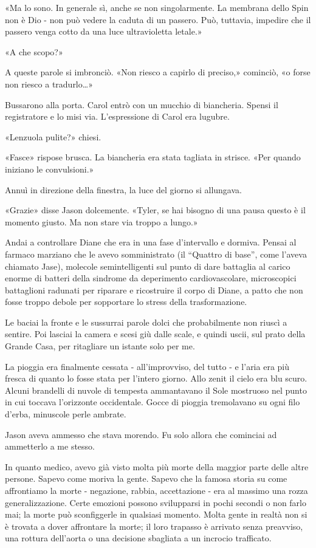 «Ma lo sono. In generale sì, anche se non singolarmente. La membrana
dello Spin non è Dio - non può vedere la caduta di un passero. Può,
tuttavia, impedire che il passero venga cotto da una luce ultravioletta
letale.»

«A che scopo?»

A queste parole si imbronciò. «Non riesco a capirlo di preciso,»
cominciò, «o forse non riesco a tradurlo\ldots»

Bussarono alla porta. Carol entrò con un mucchio di biancheria. Spensi
il registratore e lo misi via. L'espressione di Carol era lugubre.

«Lenzuola pulite?» chiesi.

«Fasce» rispose brusca. La biancheria era stata tagliata in strisce.
«Per quando iniziano le convulsioni.»

Annuì in direzione della finestra, la luce del giorno si allungava.

«Grazie» disse Jason dolcemente. «Tyler, se hai bisogno di una pausa
questo è il momento giusto. Ma non stare via troppo a lungo.»

\separatorefiori

Andai a controllare Diane che era in una fase d'intervallo e dormiva.
Pensai al farmaco marziano che le avevo somministrato (il ``Quattro di
base'', come l'aveva chiamato Jase), molecole semintelligenti sul punto
di dare battaglia al carico enorme di batteri della sindrome da
deperimento cardiovascolare, microscopici battaglioni radunati per
riparare e ricostruire il corpo di Diane, a patto che non fosse troppo
debole per sopportare lo stress della trasformazione.

Le baciai la fronte e le sussurrai parole dolci che probabilmente non
riuscì a sentire. Poi lasciai la camera e scesi giù dalle scale, e
quindi uscii, sul prato della Grande Casa, per ritagliare un istante
solo per me.

La pioggia era finalmente cessata - all'improvviso, del tutto - e l'aria
era più fresca di quanto lo fosse stata per l'intero giorno. Allo zenit
il cielo era blu scuro. Alcuni brandelli di nuvole di tempesta
ammantavano il Sole mostruoso nel punto in cui toccava l'orizzonte
occidentale. Gocce di pioggia tremolavano su ogni filo d'erba, minuscole
perle ambrate.

Jason aveva ammesso che stava morendo. Fu solo allora che cominciai ad
ammetterlo a me stesso.

In quanto medico, avevo già visto molta più morte della maggior parte
delle altre persone. Sapevo come moriva la gente. Sapevo che la famosa
storia su come affrontiamo la morte - negazione, rabbia, accettazione -
era al massimo una rozza generalizzazione. Certe emozioni possono
svilupparsi in pochi secondi o non farlo mai; la morte può sconfiggerle
in qualsiasi momento. Molta gente in realtà non si è trovata a dover
affrontare la morte; il loro trapasso è arrivato senza preavviso, una
rottura dell'aorta o una decisione sbagliata a un incrocio trafficato.

